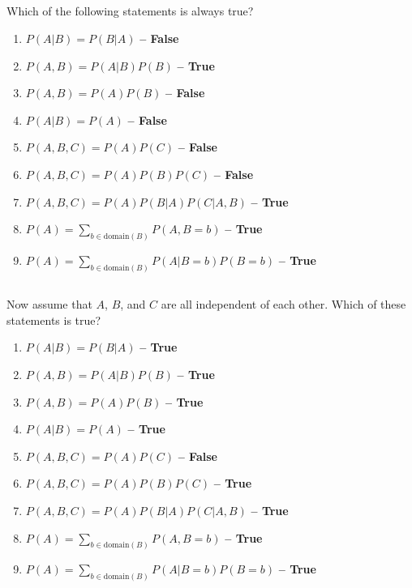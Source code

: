 \documentclass[11pt,letterpaper]{article}
\theoremstyle{definition}
\begin{document}

\subsection{}
Which of the following statements is always true?

\begin{enumerate}
\item $P(A|B) = P(B|A)$ \textbf{ -- False}
\item $P(A,B) = P(A|B) P(B)$ \textbf{ -- True}
\item $P(A,B) = P(A) P(B)$ \textbf{ -- False}
\item $P(A|B) = P(A)$ \textbf{ -- False}
\item $P(A,B,C) = P(A) P(C)$ \textbf{ -- False}
\item $P(A,B,C) = P(A) P(B) P(C)$ \textbf{ -- False}
\item $P(A,B,C) = P(A) P(B|A) P(C|A,B)$ \textbf{ -- True}
\item $P(A) = \sum_{b \in \text{domain}(B)} P(A, B=b)$ \textbf{ -- True}
\item $P(A) = \sum_{b \in \text{domain}(B)} P(A | B=b) P(B=b)$ \textbf{ -- True}
\end{enumerate}

\subsection{}
Now assume that $A$, $B$, and $C$ are all independent of each other.
Which of these statements is true?
\begin{enumerate}
\item $P(A|B) = P(B|A)$ \textbf{ -- True}
\item $P(A,B) = P(A|B) P(B)$ \textbf{ -- True}
\item $P(A,B) = P(A) P(B)$ \textbf{ -- True}
\item $P(A|B) = P(A)$ \textbf{ -- True}
\item $P(A,B,C) = P(A) P(C)$ \textbf{ -- False}
\item $P(A,B,C) = P(A) P(B) P(C)$ \textbf{ -- True}
\item $P(A,B,C) = P(A) P(B|A) P(C|A,B)$ \textbf{ -- True}
\item $P(A) = \sum_{b \in \text{domain}(B)} P(A, B=b)$ \textbf{ -- True}
\item $P(A) = \sum_{b \in \text{domain}(B)} P(A | B=b) P(B=b)$ \textbf{ -- True}
\end{enumerate}
\end{document}
